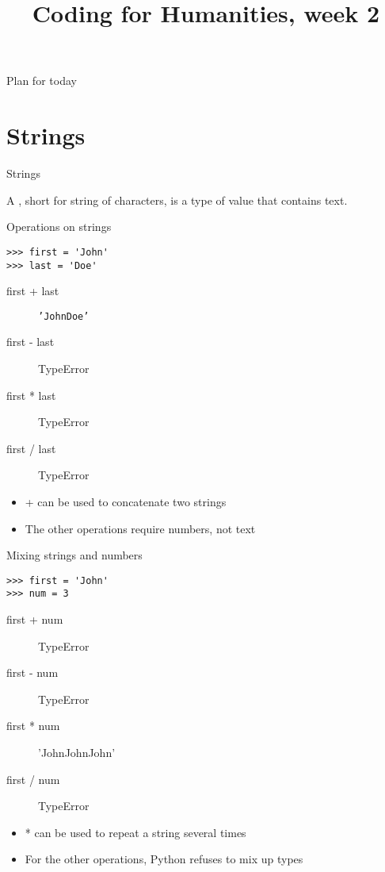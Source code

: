 \documentclass[aspectratio=169,usenames,dvipsnames]{beamer}
\title{Coding for Humanities, week 2}
\begin{document}
\begin{frame}
 \titlepage
\end{frame}

\begin{frame}{Plan for today}
 \tableofcontents
\end{frame}

\section{Strings}
\frame{\tableofcontents[currentsection]}

\begin{frame}{Strings}
    \begin{definition}
        A , short for string of characters,
        is a type of value that contains text.
    \end{definition}

\end{frame}

\begin{frame}[fragile]{Operations on strings}
\begin{lstlisting}
>>> first = 'John'
>>> last = 'Doe'
\end{lstlisting}
\begin{description}
    \item[first + last] \texttt{'JohnDoe'}
    \item[first - last] TypeError
    \item[first * last] TypeError
    \item[first / last] TypeError
\end{description}

\begin{itemize}
\item + can be used to concatenate two strings
\item The other operations require numbers, not text
\end{itemize}
\end{frame}

\begin{frame}[fragile]{Mixing strings and numbers}
\begin{lstlisting}
>>> first = 'John'
>>> num = 3
\end{lstlisting}
\begin{description}
    \item[first + num] TypeError
    \item[first - num] TypeError
    \item[first * num] 'JohnJohnJohn'
    \item[first / num] TypeError
\end{description}

\begin{itemize}
\item * can be used to repeat a string several times
\item For the other operations, Python refuses to mix up types
\end{itemize}
\end{frame}
\end{document}
